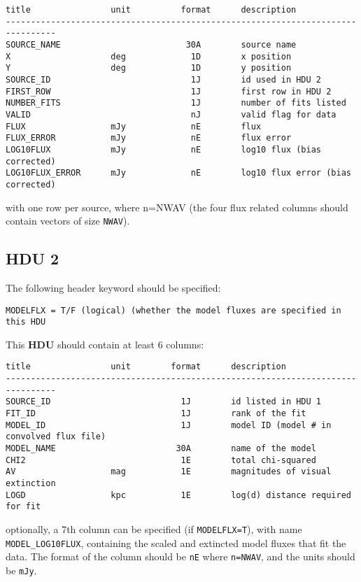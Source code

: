 \documentclass[11pt]{article}
\begin{document}
\begin{verbatim}
title                unit          format      description
--------------------------------------------------------------------------------
SOURCE_NAME                         30A        source name
X                    deg             1D        x position
Y                    deg             1D        y position
SOURCE_ID                            1J        id used in HDU 2
FIRST_ROW                            1J        first row in HDU 2
NUMBER_FITS                          1J        number of fits listed
VALID                                nJ        valid flag for data
FLUX                 mJy             nE        flux
FLUX_ERROR           mJy             nE        flux error
LOG10FLUX            mJy             nE        log10 flux (bias corrected)
LOG10FLUX_ERROR      mJy             nE        log10 flux error (bias corrected)
\end{verbatim}

with one row per source, where n=NWAV (the four flux related columns should contain vectors of size \texttt{NWAV}).

\subsection{HDU 2}

The following header keyword should be specified:

\begin{verbatim}
MODELFLX = T/F (logical) (whether the model fluxes are specified in this HDU
\end{verbatim}

This \textbf{HDU} should contain at least 6 columns:

\begin{verbatim}
title                unit        format      description
--------------------------------------------------------------------------------
SOURCE_ID                          1J        id listed in HDU 1
FIT_ID                             1J        rank of the fit
MODEL_ID                           1J        model ID (model # in convolved flux file)
MODEL_NAME                        30A        name of the model
CHI2                               1E        total chi-squared
AV                   mag           1E        magnitudes of visual extinction
LOGD                 kpc           1E        log(d) distance required for fit
\end{verbatim}

optionally, a 7th column can be specified (if \texttt{MODELFLX=T}), with name \texttt{MODEL\_LOG10FLUX}, containing the scaled and extincted model fluxes that fit the data. The format of the column should be \texttt{nE} where \texttt{n=NWAV}, and the units should be \texttt{mJy}.
\end{document}
